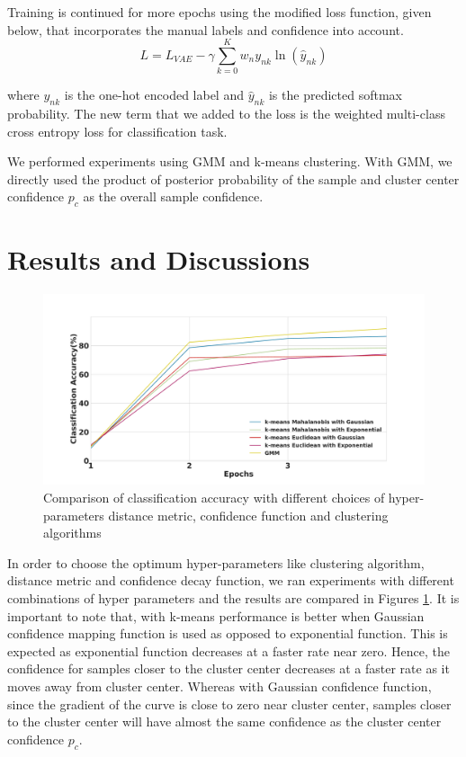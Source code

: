 \documentclass{bmvc2k}
\begin{document}
Training is continued for more epochs using the modified loss function, given below, that incorporates the manual labels and confidence into account.
\begin{equation} \label{semi_supervised_loss}
L = L_{VAE}  - \gamma \sum_{k=0}^{K}w_{n}y_{nk}\ln(\hat{y}_{nk})
\end{equation}

where $y_{nk}$ is the one-hot encoded label and $\hat{y}_{nk}$ is the predicted softmax probability.
The new term that we added to the loss is the weighted multi-class cross entropy loss for classification task.


We performed experiments using GMM and k-means clustering.
With GMM, we directly used the product of posterior probability of the sample and cluster center confidence $p_c$ as the overall sample confidence.


\section{Results and Discussions}

\begin{figure}[!t]
\centering
  \centering
  \includegraphics[width=.7\linewidth]{images/classification_accuracy_hyperparameter}
\vspace{0.1in}

\caption{Comparison of classification accuracy with different choices of hyper-parameters distance metric, confidence function and clustering algorithms}
\label{classification_acc}
\end{figure}

In order to choose the optimum hyper-parameters like clustering algorithm, distance metric and confidence decay function, we ran experiments with different combinations of hyper parameters and the results are compared in Figures \ref{classification_acc}.
It is important to note that, with k-means performance is better when Gaussian confidence mapping function is used as opposed to exponential function.
This is expected as exponential function decreases at a faster rate near zero.
Hence, the confidence for samples closer to the cluster center decreases at a faster rate as it moves away from cluster center.
Whereas  with Gaussian confidence function, since the gradient of the curve is close to zero near cluster center, samples closer to the cluster center will have almost the same confidence as the cluster center confidence $p_c$.
\end{document}
